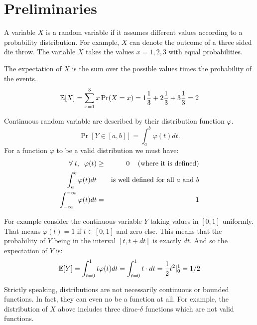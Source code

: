

\section{Preliminaries}
A variable $X$ is a random variable if it assumes different values
according to a probability distribution. For example, $X$ can 
denote the outcome of a three sided die throw. 
The variable $X$ takes the values $x = 1,2,3$ with equal probabilities. 

The expectation of $X$ is the sum over the possible values times the probability of the events.
\begin{equation}
{\mathbb E}[X] = \sum_{x=1}^{3}x \Pr(X = x)=
1\frac{1}{3}+2\frac{1}{3}+3\frac{1}{3} = 2
\end{equation}


Continuous random variable are described by their distribution function $\varphi$.
$$
\Pr[Y \in [a,b]] = \int_{a}^{b}\varphi (t) dt.
$$
For a function $\varphi$ to be a valid distribution we must have:
\begin{eqnarray}
\forall \;t, \;\; \varphi(t) &\ge& 0  \mbox{\;\;\; (where it is defined)}\\
\int_{a}^{b}\varphi (t) dt && \mbox{is well defined for all $a$ and $b$}\\
\int_{-\infty}^{-\infty}\varphi (t) dt &=& 1
\end{eqnarray}

For example consider the continuous variable $Y$ taking values in
$[0,1]$ uniformly. That means $\varphi(t) = 1$ if $t \in [0,1]$ and zero else.
This means that the probability of $Y$ being in the interval $[t,t + dt]$ is exactly $dt$. And so the expectation of $Y$ is:
\begin{equation}
{\mathbb E}[Y] = \int_{t=0}^{1}t \varphi(t) dt = \int_{t=0}^{1}t \cdot dt = \frac{1}{2}t^2|_{0}^{1} = 1/2
\end{equation}

\begin{remark}
Strictly speaking, distributions are not necessarily continuous or bounded functions. 
In fact, they can even no be a function at all. 
For example, the distribution of $X$ above includes three dirac-$\delta$ functions which are not valid functions.
\end{remark}


